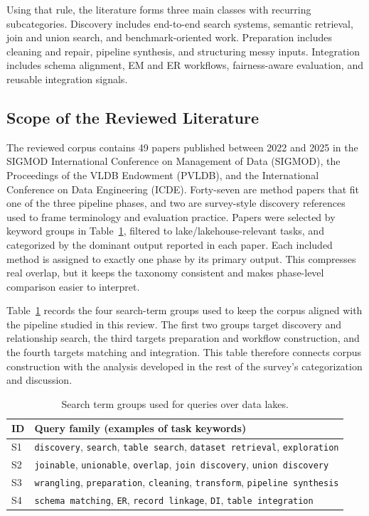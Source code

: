 \documentclass[sigconf]{acmart}
\newcommand{\tbl}{%
  \scriptsize
  \setlength{\tabcolsep}{4pt}%
  \renewcommand{\arraystretch}{1.12}%
}
\begin{document}
Using that rule, the literature forms three main classes with recurring subcategories. Discovery includes end-to-end search systems, semantic retrieval, join and union search, and benchmark-oriented work. Preparation includes cleaning and repair, pipeline synthesis, and structuring messy inputs. Integration includes schema alignment, EM and ER workflows, fairness-aware evaluation, and reusable integration signals.

\subsection{Scope of the Reviewed Literature}
The reviewed corpus contains 49 papers published between 2022 and 2025 in the SIGMOD International Conference on Management of Data (SIGMOD), the Proceedings of the VLDB Endowment (PVLDB), and the International Conference on Data Engineering (ICDE). Forty-seven are method papers that fit one of the three pipeline phases, and two are survey-style discovery references used to frame terminology and evaluation practice. Papers were selected by keyword groups in Table~\ref{tab:search-strings}, filtered to lake/lakehouse-relevant tasks, and categorized by the dominant output reported in each paper. Each included method is assigned to exactly one phase by its primary output. This compresses real overlap, but it keeps the taxonomy consistent and makes phase-level comparison easier to interpret.

Table~\ref{tab:search-strings} records the four search-term groups used to keep the corpus aligned with the pipeline studied in this review. The first two groups target discovery and relationship search, the third targets preparation and workflow construction, and the fourth targets matching and integration. This table therefore connects corpus construction with the analysis developed in the rest of the survey's categorization and discussion.

\begin{table}[!htbp]
\caption{Search term groups used for queries over data lakes.}
\label{tab:search-strings}
\centering
\tbl
\begin{tabularx}{\columnwidth}{@{}p{8mm}X@{}}
\toprule
\textbf{ID} & \textbf{Query family (examples of task keywords)} \\
\midrule
S1 & \texttt{discovery}, \texttt{search}, \texttt{table search}, \texttt{dataset retrieval}, \texttt{exploration} \\
S2 & \texttt{joinable}, \texttt{unionable}, \texttt{overlap}, \texttt{join discovery}, \texttt{union discovery} \\
S3 & \texttt{wrangling}, \texttt{preparation}, \texttt{cleaning}, \texttt{transform}, \texttt{pipeline synthesis} \\
S4 & \texttt{schema matching}, \texttt{ER}, \texttt{record linkage}, \texttt{DI}, \texttt{table integration} \\
\bottomrule
\end{tabularx}
\end{table}
\end{document}
